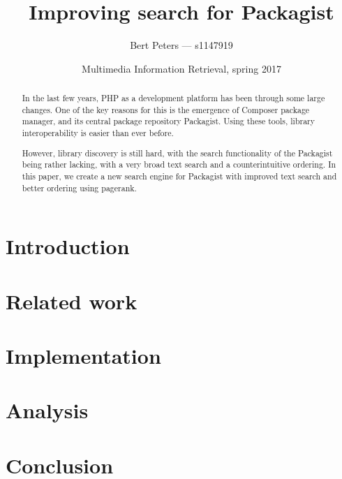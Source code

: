 \documentclass{article}
\title{Improving search for Packagist}
\author{Bert Peters --- s1147919}
\date{Multimedia Information Retrieval, spring 2017}
\begin{document}
\maketitle

\begin{abstract}
	In the last few years, PHP as a development platform has been through some large changes. One of the key reasons for this is the emergence of Composer package manager, and its central package repository Packagist. Using these tools, library interoperability is easier than ever before.

	However, library discovery is still hard, with the search functionality of the Packagist being rather lacking, with a very broad text search and a counterintuitive ordering. In this paper, we create a new search engine for Packagist with improved text search and better ordering using pagerank.
\end{abstract}

\section{Introduction}

\section{Related work}

\section{Implementation}

\section{Analysis}

\section{Conclusion}
\end{document}
